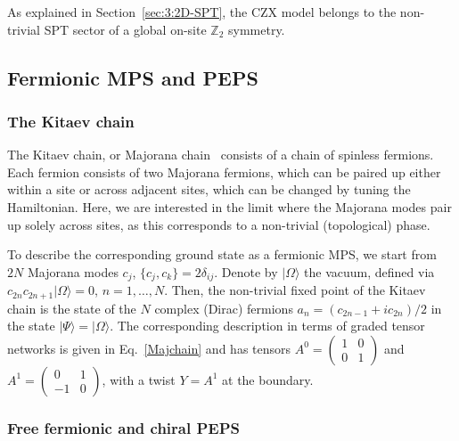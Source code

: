\documentclass[rmp,aps,reprint,superscriptaddress,nobalancelastpage]{revtex4-1}
\newcommand{\ket}[1]{\vert#1\rangle}
\let\endignorethis\relax
\def\TOCstop{\addtocontents{toc}{\ignorethis}}
\def\TOCstart{\addtocontents{toc}{\endignorethis}}
\begin{document}
    As explained in Section~\ref{sec:3:2D-SPT}, the CZX model belongs to the non-trivial SPT sector of a global on-site $\mathbb{Z}_2$ symmetry.



    \TOCstart
    \subsection{Fermionic MPS and PEPS}
    \TOCstop



    \subsubsection{The Kitaev chain}

    The Kitaev chain, or Majorana chain~\cite{kitaev:majorana-chain} consists of a chain of spinless fermions. Each fermion consists of two Majorana fermions, which can be paired up either within a site or across adjacent sites, which can be changed by tuning the Hamiltonian. Here, we are interested in the limit where the Majorana modes pair up solely across sites, as this corresponds to a non-trivial (topological) phase.

    To describe the corresponding ground state as a fermionic MPS, we start from $2N$ Majorana modes $c_j$, $\{c_j,c_k\}=2\delta_{ij}$.
    Denote by $\ket\Omega$ the vacuum, defined via $c_{2n}c_{2n+1}\ket{\Omega}=0$, $n=1,\dots,N$. Then, the non-trivial fixed point of the Kitaev chain is the state of the $N$ complex (Dirac) fermions $a_n=(c_{2n-1}+ic_{2n})/2$ in the state $\ket\Psi=\ket\Omega$. The corresponding description in terms of graded tensor networks is given in Eq.~\eqref{Majchain} and has tensors \cite{bultinck:fermionic-mps-phases} $A^0=\left(\begin{smallmatrix}1&0\\0&1\end{smallmatrix}\right)$ and
$A^1=\left(\begin{smallmatrix}0&1\\-1&0\end{smallmatrix}\right)$, with a twist $Y=A^1$ at the boundary.



    \subsubsection{Free fermionic and chiral PEPS}
\end{document}
